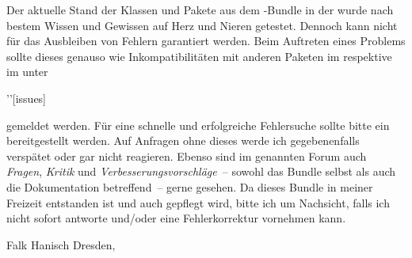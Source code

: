 Der aktuelle Stand der Klassen und Pakete aus dem \TUDScript-Bundle in der 
 wurde nach bestem Wissen und Gewissen auf Herz und Nieren 
getestet. Dennoch kann nicht für das Ausbleiben von Fehlern garantiert werden. 
Beim Auftreten eines Problems sollte dieses genauso wie Inkompatibilitäten mit 
anderen Paketen im \Forum* respektive im \GitHubRepo*[issues] unter
\begin{quoting}
\Forum'\newline\GitHubRepo'[issues]%
\end{quoting}
gemeldet werden. Für eine schnelle und erfolgreiche Fehlersuche sollte bitte 
ein  
bereitgestellt werden. Auf Anfragen ohne dieses werde ich gegebenenfalls 
verspätet oder gar nicht reagieren. Ebenso sind im genannten Forum auch 
\emph{Fragen}, \emph{Kritik} und \emph{Verbesserungsvorschläge}~-- sowohl das 
Bundle selbst als auch die Dokumentation betreffend~-- gerne gesehen. Da dieses 
Bundle in meiner Freizeit entstanden ist und auch gepflegt wird, bitte ich um 
Nachsicht, falls ich nicht sofort antworte und/oder eine Fehlerkorrektur 
vornehmen kann.

\bigskip
\noindent Falk Hanisch\newline
Dresden, 
